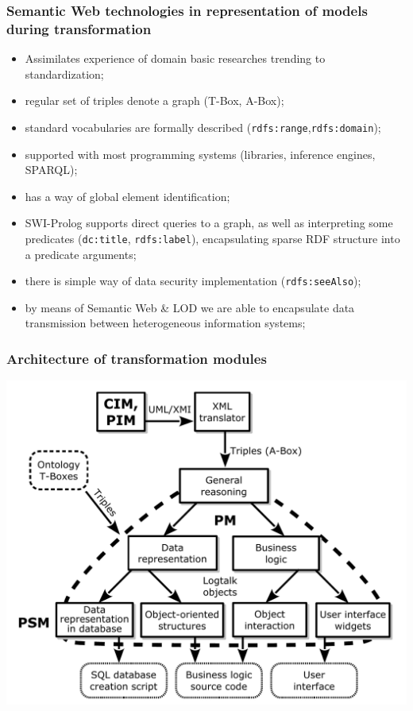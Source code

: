 \documentclass[10pt]{beamer}
\begin{document}
\begin{frame}[fragile]
  \frametitle{Semantic Web technologies in representation of models
    during transformation}
  \begin{itemize}
  \item Assimilates experience of domain basic researches trending to standardization;
  \item regular set of triples denote a graph (T-Box, A-Box);
  \item standard vocabularies are formally described (\verb|rdfs:range|,\verb|rdfs:domain|);
  \item supported with most programming systems (libraries, inference engines, SPARQL);
  \item has a way of global element identification;
  \item SWI-Prolog supports direct queries to a graph, as well as interpreting some predicates (\verb|dc:title|, \verb|rdfs:label|), encapsulating sparse RDF structure into a predicate arguments;
  \item there is simple way of data security implementation (\verb|rdfs:seeAlso|);
  \item by means of Semantic Web \& LOD we are able to encapsulate data transmission between heterogeneous information systems;
  \end{itemize}
\end{frame}


\begin{frame}
  \frametitle{Architecture of transformation modules}
  \centering
  \includegraphics[width=0.9\linewidth]{architect_tree_pres-en-wo-OCL.pdf}
\end{frame}
\end{document}
